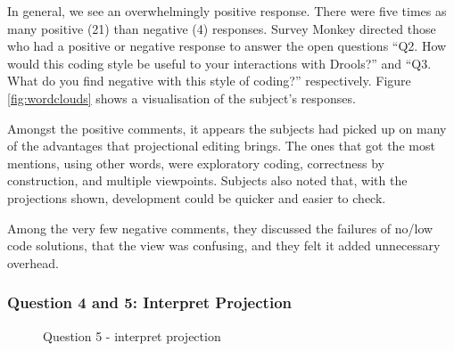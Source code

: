 In general, we see an overwhelmingly positive response.
There were five times as many positive (21) than negative (4) responses.
Survey Monkey directed those who had a positive or negative response to answer the open questions ``Q2. How would this coding style be useful to your interactions with Drools?'' and ``Q3. What do you find negative with this style of coding?'' respectively.
Figure \ref{fig:wordclouds} shows a visualisation of the subject's responses.

Amongst the positive comments, it appears the subjects had picked up on many of the advantages that projectional editing brings.
The ones that got the most mentions, using other words, were exploratory coding, correctness by construction, and multiple viewpoints.
Subjects also noted that, with the projections shown, development could be quicker and easier to check.

Among the very few negative comments, they discussed the failures of no/low code solutions, that the view was confusing, and they felt it added unnecessary overhead.

\subsubsection{Question 4 and 5: Interpret Projection}

\begin{figure}
    \centering
    \caption{Question 5 - interpret projection}
    \label{fig:stackedbar_Q2}
\end{figure}

